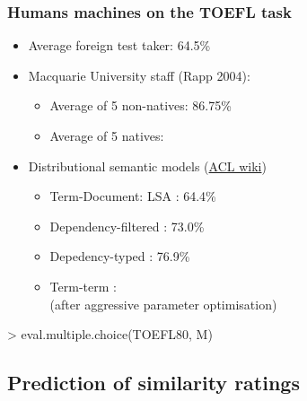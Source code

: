 \documentclass[t]{beamer} %
\begin{document}
\begin{frame}[fragile]
  \frametitle{Humans \vs machines on the TOEFL task}

  \ungap[1]
  \begin{itemize}
  \item Average foreign test taker: 64.5\%
  \item<2-> Macquarie University staff (Rapp 2004):
    \begin{itemize}
    \item Average of 5 non-natives: 86.75\%
    \item Average of 5 natives: 
    \end{itemize}
  \item<3-> Distributional semantic models (\href{https://aclweb.org/aclwiki/Similarity_(State_of_the_art)}{ACL wiki}) 
    \begin{itemize}
    \item Term-Document: LSA \citep{Landauer:Dumais:97}: 64.4\%
    \item Dependency-filtered \citep{Pado:Lapata:07}: 73.0\%
    \item Depedency-typed \citep{Baroni:Lenci:10}: 76.9\%
    \item Term-term \citet{Bullinaria:Levy:12}: \\
      (after aggressive parameter optimisation)
    \end{itemize}
  \end{itemize}

  \vfill
\begin{Rcode}
> eval.multiple.choice(TOEFL80, M)
\end{Rcode}
\end{frame}


\subsection{Prediction of similarity ratings}
\end{document}
